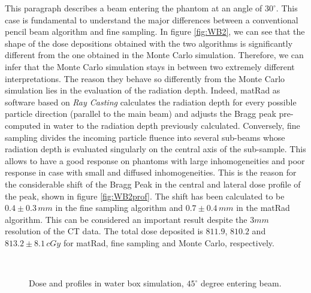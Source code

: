 \documentclass[12pt, a4paper, twoside]{book}
\begin{document}
This paragraph describes a beam entering the phantom at an angle of $30^\circ$. This case is fundamental to understand the major differences between a conventional pencil beam algorithm and fine sampling. In figure \ref{fig:WB2}, we can see that the shape of the dose depositions obtained with the two algorithms is significantly different from the one obtained in the Monte Carlo simulation. Therefore, we can infer that the Monte Carlo simulation stays in between two extremely different interpretations.
The reason they behave so differently from the Monte Carlo simulation lies in the evaluation of the radiation depth. Indeed, matRad as software based on \emph{Ray Casting} calculates the radiation depth for every possible particle direction (parallel to the main beam) and adjusts the Bragg peak pre-computed in water to the radiation depth previously calculated. Conversely, fine sampling divides the incoming particle fluence into several sub-beams whose radiation depth is evaluated singularly on the central axis of the sub-sample. This allows to have a good response on phantoms with large inhomogeneities and poor response in case with small and diffused inhomogeneities.
This is the reason for the considerable shift of the Bragg Peak in the central and lateral dose profile of the peak, shown in figure \ref{fig:WB2prof}. The shift has been calculated to be $0.4\pm0.3\,mm$ in the fine sampling algorithm and $0.7\pm0.4\,mm$ in the matRad algorithm. This can be considered an important result despite the $3mm$ resolution of the CT data.
The total dose deposited is $811.9$, $810.2$ and $813.2\pm8.1\,cGy$ for matRad, fine sampling and Monte Carlo, respectively.

\begin{figure}[!h]
\centering
{} 
 \\
\caption{Dose and profiles in water box simulation,  $45^\circ$ degree entering beam.}
\label{fig:WB3prof}
\end{figure}
\end{document}
